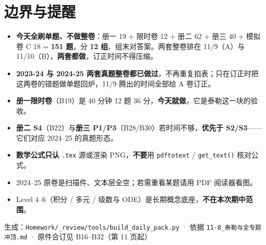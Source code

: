 \documentclass[10pt,a4paper]{ctexart}
\begin{document}
\section*{边界与提醒}
\begin{itemize}
\item \textbf{今天全刷单题、不做整卷}：册一 19 + 限时卷 12 + 册二 62 + 册三 40 + 模拟卷 C 18 = \textbf{151 题}，分 \textbf{12 组}、组末对答案。两套整卷排在 11/9（A）与 11/10（B），\textbf{两套都做}，订正时间不得压缩。
\item \textbf{2023-24 与 2024-25 两套真题整卷都已做过}，不再重复掐表；只在订正时把这两卷的错题做单题回炉，11/9 腾出的时间全部给 A 卷订正。
\item \textbf{册一限时卷}（B19）是 40 分钟 12 题 36 分，\textbf{今天就做}，它是泰勒这一块的验收。
\item \textbf{册二 S4}（B22）与\textbf{册三 P1/P3}（B28/B30）若时间不够，\textbf{优先于 S2/S3}——它们对应 2024--25 的真题形态。
\item \textbf{数学公式只认} \texttt{.tex} 源或渲染 PNG，\textbf{不要}用 \texttt{pdftotext} / \texttt{get\_text()} 核对公式。
\item 2024--25 原卷是扫描件、文本层全空；若需重看某题请用 PDF 阅读器看图。
\item Level 4--6（积分 / 多元 / 级数与 ODE）是长期概念底座，\textbf{不在本次期中范围}。
\end{itemize}

\vfill
\begin{center}
{\small\color{gray} 生成：\texttt{Homework/\_review/tools/build\_daily\_pack.py} ·
依据 \texttt{11-8\_泰勒与全专题冲顶.md} ·
原件合订见 B16--B32（第 11 页起）}
\end{center}
\end{document}
